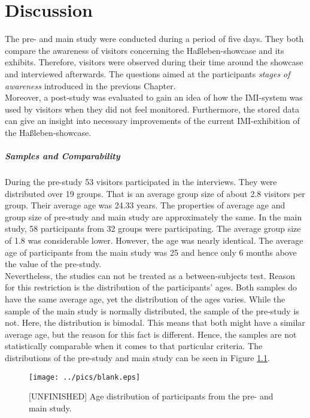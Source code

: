 \chapter{Discussion}
\label{discussion}

The pre- and main study were conducted during a period of five days. They both compare the awareness of visitors concerning the Haßleben-showcase and its exhibits. Therefore, visitors were observed during their time around the showcase and interviewed afterwards. The questions aimed at the participants \textit{stages of awareness} introduced in the previous Chapter.
\\
Moreover, a post-study was evaluated to gain an idea of how the \ac{IMI}-system was used by visitors when they did not feel monitored. Furthermore, the stored data can give an insight into necessary improvements of the current \ac{IMI}-exhibition of the Haßleben-showcase.

\paragraph{Samples and Comparability} During the pre-study 53 visitors participated in the interviews. They were distributed over 19 groups. That is an average group size of about 2.8 visitors per group. Their average age was 24.33 years. The properties of average age and group size of pre-study and main study are approximately the same. In the main study, 58 participants from 32 groups were participating. The average group size of 1.8 was considerable lower. However, the age was nearly identical. The average age of participants from the main study was 25 and hence only 6 months above the value of the pre-study.
\\
Nevertheless, the studies can not be treated as a between-subjects test. Reason for this restriction is the distribution of the participants' ages. Both samples do have the same average age, yet the distribution of the ages varies. While the sample of the main study is normally distributed, the sample of the pre-study is not. Here, the distribution is bimodal. This means that both might have a similar average age, but the reason for this fact is different. Hence, the samples are not statistically comparable when it comes to that particular criteria. The distributions of the pre-study and main study can be seen in Figure \ref{fig:discussion_age-distribution}.
\begin{figure}[H]%
\texttt{[image: ../pics/blank.eps]}%
\caption{[UNFINISHED] Age distribution of participants from the pre- and main study.}
\label{fig:discussion_age-distribution} 
\end{figure}

